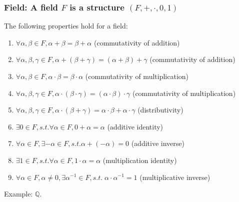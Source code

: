 \documentclass[notes=no]{beamer}
\begin{document}
\begin{frame}
	\frametitle{Field: A field $F$ is a structure $(F,+,\cdot,0,1 )$}
	The following properties hold for a field:
	\begin{enumerate}
		\item $\forall \alpha, \beta \in F, \alpha + \beta = \beta +\alpha$ (commutativity of addition)
		\item $\forall \alpha, \beta, \gamma \in F, \alpha + (\beta + \gamma) = (\alpha+\beta) + \gamma$ (commutativity of addition)
		\item $\forall \alpha, \beta \in F, \alpha \cdot \beta = \beta \cdot \alpha$ (commutativity of multiplication)
		\item $\forall \alpha, \beta, \gamma \in F, \alpha \cdot (\beta \cdot \gamma) = (\alpha\cdot\beta) \cdot \gamma$ (commutativity of multiplication)
		\item $\forall \alpha, \beta, \gamma \in F, \alpha \cdot (\beta + \gamma)= \alpha\cdot\beta + \alpha\cdot\gamma$ (distributivity)
		\item $\exists 0 \in F, s.t. \forall \alpha \in F, 0 + \alpha = \alpha$ (additive identity)
		\item $\forall \alpha \in F, \exists -\alpha \in F, s.t. \alpha+(-\alpha)=0$ (additive inverse)
		\item $\exists 1 \in F, s.t. \forall \alpha \in F, 1 \cdot \alpha = \alpha$ (multiplication identity)
		\item $\forall \alpha \in F, \alpha \neq 0, \exists \alpha^{-1} \in F, s.t. \; \alpha\cdot\alpha^{-1}=1$ (multiplicative inverse)
	\end{enumerate}
	Example: $\mathbb{Q}$.
\end{frame}
\end{document}
